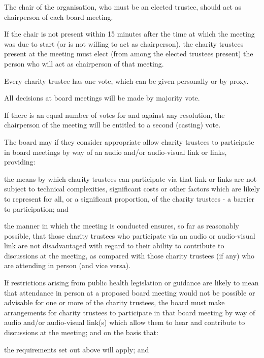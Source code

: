 ﻿\documentclass[a4paper,11pt,onecolumn ]{article}
\begin{document}
\begin{legal}
\item The chair of the organisation, who must be an elected trustee, should act as chairperson of each board meeting.
\item If the chair is not present within 15 minutes after the time at which the meeting was due to start (or is not willing to act as chairperson), the charity trustees present at the meeting must elect (from among the elected trustees present) the person who will act as chairperson of that meeting.
\item Every charity trustee has one vote, which can be given personally or by proxy. 
\item All decisions at board meetings will be made by majority vote.
\item If there is an equal number of votes for and against any resolution, the chairperson of the meeting will be entitled to a second (casting) vote.
\item The board may if they consider appropriate allow charity trustees to participate in board meetings by way of an audio and/or audio-visual link or links, providing: 
    \begin{legal}[label=\alph*)]
    \item the means by which charity trustees can participate via that link or links are not subject to technical complexities, significant costs or other factors which are likely to represent for all, or a significant proportion, of the charity trustees - a barrier to participation; and 
    \item the manner in which the meeting is conducted ensures, so far as reasonably possible, that those charity trustees who participate via an audio or audio-visual link are not disadvantaged with regard to their ability to contribute to discussions at the meeting, as compared with those charity trustees (if any) who are attending in person (and vice versa).
    \end{legal}
\item If restrictions arising from public health legislation or guidance are likely to mean that attendance in person at a proposed board meeting would not be possible or advisable for one or more of the charity trustees, the board must make arrangements for charity trustees to participate in that board meeting by way of audio and/or audio-visual link(s) which allow them to hear and contribute to discussions at the meeting; and on the basis that: 
    \begin{legal}[label=\alph*)]
    \item the requirements set out above will apply; and 

\end{legal}
\end{legal}
\end{document}
